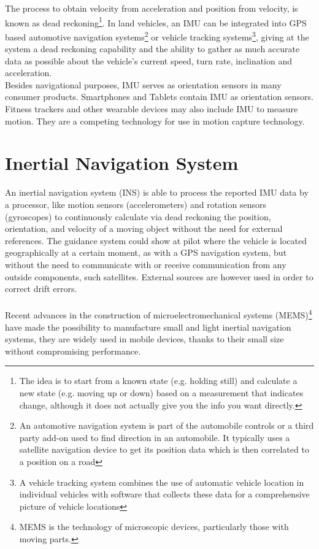 \documentclass[tesi]{subfiles}
\begin{document}
\noindent The process to obtain velocity from acceleration and position from velocity, is known as dead reckoning\footnote{The idea is to start from a known state (e.g. holding still) and calculate a new state (e.g. moving up or down) based on a measurement that indicates change, although it does not actually give you the info you want directly.}.
In land vehicles, an IMU can be integrated into GPS based automotive navigation systems\footnote{An automotive navigation system is part of the automobile controls or a third party add-on used to find direction in an automobile. It typically uses a satellite navigation device to get its position data which is then correlated to a position on a road} or vehicle tracking systems\footnote{A vehicle tracking system combines the use of automatic vehicle location in individual vehicles with software that collects these data for a comprehensive picture of vehicle locations}, giving at the system a dead reckoning capability and the ability to gather as much accurate data as possible about the vehicle's current speed, turn rate, inclination and acceleration. \\
Besides navigational purposes, IMU serves as orientation sensors in many consumer products. Smartphones and Tablets contain IMU as orientation sensors. Fitness trackers and other wearable devices may also include IMU to measure motion.  They are a competing technology for use in motion capture technology\cite{motioncapture}.
\section{Inertial Navigation System}\label{sc:Inertial Navigation System}
An inertial navigation system (INS) is able to process the reported IMU data by a processor, like motion sensors (accelerometers) and rotation sensors (gyroscopes) to continuously calculate via dead reckoning the position, orientation, and velocity of a moving object without the need for external references\cite{basicprincipleaereo}.  
The guidance system could show at pilot where the vehicle is located geographically at a certain moment, as with a GPS navigation system, but without the need to communicate with or receive communication from any outside components, such satellites. External sources are however used in order to correct drift errors.\\\\Recent advances in the construction of microelectromechanical systems (MEMS)\footnote{MEMS is the technology of microscopic devices, particularly those with moving parts.} have made the possibility to manufacture small and light inertial navigation systems, they are widely used in mobile devices, thanks to their small size without compromising performance.\\
\end{document}
